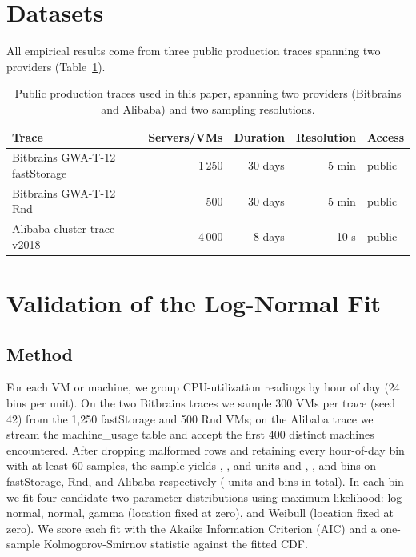 \documentclass[11pt,a4paper]{article}
\begin{document}
\section{Datasets}
\label{sec:datasets}

All empirical results come from three public production traces spanning
two providers (Table~\ref{tab:datasets}).

\begin{table}[t]
  \centering
  \small
  \begin{tabular}{lrrrl}
    \toprule
    Trace & Servers/VMs & Duration & Resolution & Access \\
    \midrule
    Bitbrains GWA-T-12 fastStorage    & 1\,250  & 30 days & 5 min  & public~\cite{shen2015bitbrains} \\
    Bitbrains GWA-T-12 Rnd            & 500    & 30 days & 5 min  & public~\cite{shen2015bitbrains} \\
    Alibaba cluster-trace-v2018       & ~4\,000 & 8 days  & 10 s   & public~\cite{alibaba2018trace} \\
    \bottomrule
  \end{tabular}
  \caption{Public production traces used in this paper, spanning two
    providers (Bitbrains and Alibaba) and two sampling resolutions.}
  \label{tab:datasets}
\end{table}

\section{Validation of the Log-Normal Fit}
\label{sec:validation}

\subsection{Method}

For each VM or machine, we group CPU-utilization readings by hour of day
(24 bins per unit). On the two Bitbrains traces we sample 300 VMs per
trace (seed 42) from the 1,250 fastStorage and 500 Rnd VMs; on the
Alibaba trace we stream the machine\_usage table and accept the first
400 distinct machines encountered. After dropping malformed rows and
retaining every hour-of-day bin with at least 60 samples, the sample
yields \NVmsFs{}, \NVmsRnd{}, and \AliVms{} units and \NBinsFs{},
\NBinsRnd{}, and \AliBins{} bins on fastStorage, Rnd, and Alibaba
respectively (\CombinedNVms{} units and \CombinedNBins{} bins in total).
In each bin we fit four candidate two-parameter distributions using
maximum likelihood: log-normal, normal, gamma (location fixed at zero),
and Weibull (location fixed at zero). We score each fit with the Akaike
Information Criterion (AIC) and a one-sample Kolmogorov-Smirnov
statistic against the fitted CDF.
\end{document}
